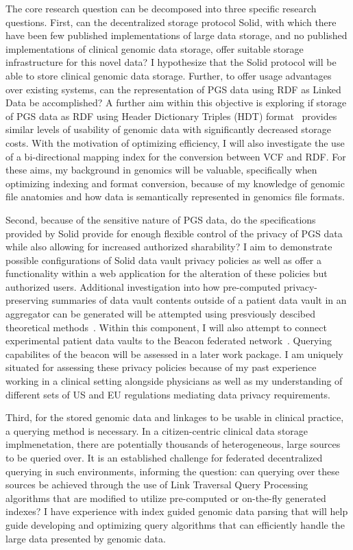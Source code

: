 \documentclass[a4paper,11pt]{article}
\begin{document}
\begin{refsection}
The core research question can be decomposed into three specific research questions.
First, can the decentralized storage protocol Solid, with which there have been few published implementations of large data storage, %
and no published implementations of clinical genomic data storage, offer suitable storage infrastructure for this novel data? 
I hypothesize that the Solid protocol will be able to store clinical genomic data storage.
Further, to offer usage advantages over existing systems, can the representation of PGS data using RDF as Linked Data be accomplished? 
A further aim within this objective is exploring if storage of PGS data as RDF using Header Dictionary Triples (HDT) format~\cite{spec:hdt} provides similar levels of usability of genomic data with significantly decreased storage costs.
With the motivation of optimizing efficiency, I will also investigate the use of a bi-directional mapping index for the conversion between VCF and RDF.
For these aims, my background in genomics will be valuable, specifically when optimizing indexing and format conversion, because of my knowledge of genomic file anatomies and how data is semantically represented in genomics file formats.

Second, because of the sensitive nature of PGS data, do the specifications provided by Solid provide for enough flexible control of the privacy of PGS data while also allowing for increased authorized sharability?
I aim to demonstrate possible configurations of Solid data vault privacy policies as well as offer a functionality within a web application for the alteration of these policies but authorized users.
Additional investigation into how pre-computed privacy-preserving summaries of data vault contents outside of a patient data vault in an aggregator can be generated will be attempted using presviously descibed theoretical methods~\cite{taelman_privacyAgg_2020}.
Within this component, I will also attempt to connect experimental patient data vaults to the Beacon federated network~\cite{rambla_beacon_2022}.
Querying capabilites of the beacon will be assessed in a later work package.
I am uniquely situated for assessing these privacy policies because of my past experience working in a clinical setting alongside physicians as well as my understanding of different sets of US and EU regulations mediating data privacy requirements.

Third, for the stored genomic data and linkages to be usable in clinical practice, a querying method is necessary.
In a citizen-centric clinical data storage implmenetation, there are potentially thousands of heterogeneous, large sources to be queried over.
It is an established challenge for federated decentralized querying in such environments, %
informing the question: can querying over these sources be achieved through the use of Link Traversal Query Processing algorithms that are modified to utilize pre-computed or on-the-fly generated indexes?
I have experience with index guided genomic data parsing that will help guide developing and optimizing query algorithms that can efficiently handle the large data presented by genomic data. 


\end{refsection}
\end{document}
